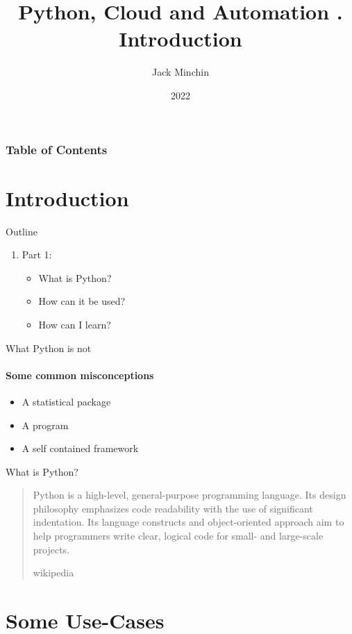 \documentclass[aspectratio=169]{beamer}
\title{\large{\textbf{Python, Cloud and Automation}} \newline\newline 1. Introduction}
\author{Jack Minchin}
\institute{Tourism Economics}
\date{2022}
\begin{document}
\frame{\titlepage}

\begin{frame}
\frametitle{Table of Contents}
\tableofcontents
\end{frame}

\section{Introduction}

\begin{frame}{Outline}
	\begin{enumerate}
		\item Part 1:
		\begin{itemize}
			\item What is Python?
			\item How can it be used?
			\item How can I learn?
		\end{itemize}

	\end{enumerate}
\end{frame}


\begin{frame}{What Python is not}
\framesubtitle{Some common misconceptions}

\begin{itemize}
	\item A statistical package
	\item A program
	\item A self contained framework
\end{itemize}

\end{frame}


\begin{frame}{What is Python?}
\blockquote[wikipedia]{
	Python is a high-level, general-purpose programming language. Its design philosophy emphasizes code readability with the use of significant indentation. Its language constructs and object-oriented approach aim to help programmers write clear, logical code for small- and large-scale projects.}
\end{frame}

\section{Some Use-Cases}
\end{document}
